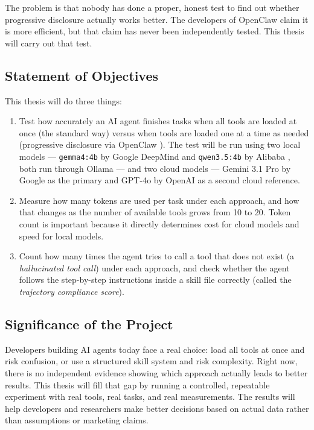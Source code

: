 The problem is that nobody has done a proper, honest test to find out whether progressive disclosure actually works better. The developers of OpenClaw claim it is more efficient, but that claim has never been independently tested. This thesis will carry out that test.

\subsection{Statement of Objectives}

This thesis will do three things:

\begin{enumerate}
    \item Test how accurately an AI agent finishes tasks when all tools are loaded at once (the standard way) versus when tools are loaded one at a time as needed (progressive disclosure via OpenClaw \cite{openclaw_2025}). The test will be run using two local models --- \texttt{gemma4:4b} by Google DeepMind \cite{gemma4_2026} and \texttt{qwen3.5:4b} by Alibaba \cite{qwen3_2025}, both run through Ollama \cite{ollama_2024} --- and two cloud models --- Gemini 3.1 Pro by Google \cite{google_gemini_2025} as the primary and GPT-4o by OpenAI \cite{openai_gpt4o_2024} as a second cloud reference.

    \item Measure how many tokens are used per task under each approach, and how that changes as the number of available tools grows from 10 to 20. Token count is important because it directly determines cost for cloud models and speed for local models.

    \item Count how many times the agent tries to call a tool that does not exist (a \textit{hallucinated tool call}) under each approach, and check whether the agent follows the step-by-step instructions inside a skill file correctly (called the \textit{trajectory compliance score}).
\end{enumerate}

\subsection{Significance of the Project}

Developers building AI agents today face a real choice: load all tools at once and risk confusion, or use a structured skill system and risk complexity. Right now, there is no independent evidence showing which approach actually leads to better results. This thesis will fill that gap by running a controlled, repeatable experiment with real tools, real tasks, and real measurements. The results will help developers and researchers make better decisions based on actual data rather than assumptions or marketing claims.
